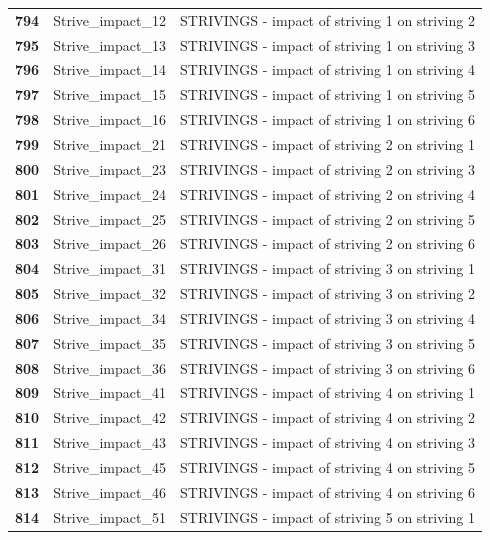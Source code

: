 \documentclass[
  letterpaper,
  DIV=11,
  numbers=noendperiod]{scrartcl}
\begin{document}
\begin{longtable}[t]{>{}cll}
\textbf{794} & Strive\_impact\_12 & STRIVINGS - impact of striving 1 on striving 2\\
\textbf{795} & Strive\_impact\_13 & STRIVINGS - impact of striving 1 on striving 3\\
\addlinespace
\textbf{796} & Strive\_impact\_14 & STRIVINGS - impact of striving 1 on striving 4\\
\textbf{797} & Strive\_impact\_15 & STRIVINGS - impact of striving 1 on striving 5\\
\textbf{798} & Strive\_impact\_16 & STRIVINGS - impact of striving 1 on striving 6\\
\textbf{799} & Strive\_impact\_21 & STRIVINGS - impact of striving 2 on striving 1\\
\textbf{800} & Strive\_impact\_23 & STRIVINGS - impact of striving 2 on striving 3\\
\addlinespace
\textbf{801} & Strive\_impact\_24 & STRIVINGS - impact of striving 2 on striving 4\\
\textbf{802} & Strive\_impact\_25 & STRIVINGS - impact of striving 2 on striving 5\\
\textbf{803} & Strive\_impact\_26 & STRIVINGS - impact of striving 2 on striving 6\\
\textbf{804} & Strive\_impact\_31 & STRIVINGS - impact of striving 3 on striving 1\\
\textbf{805} & Strive\_impact\_32 & STRIVINGS - impact of striving 3 on striving 2\\
\addlinespace
\textbf{806} & Strive\_impact\_34 & STRIVINGS - impact of striving 3 on striving 4\\
\textbf{807} & Strive\_impact\_35 & STRIVINGS - impact of striving 3 on striving 5\\
\textbf{808} & Strive\_impact\_36 & STRIVINGS - impact of striving 3 on striving 6\\
\textbf{809} & Strive\_impact\_41 & STRIVINGS - impact of striving 4 on striving 1\\
\textbf{810} & Strive\_impact\_42 & STRIVINGS - impact of striving 4 on striving 2\\
\addlinespace
\textbf{811} & Strive\_impact\_43 & STRIVINGS - impact of striving 4 on striving 3\\
\textbf{812} & Strive\_impact\_45 & STRIVINGS - impact of striving 4 on striving 5\\
\textbf{813} & Strive\_impact\_46 & STRIVINGS - impact of striving 4 on striving 6\\
\textbf{814} & Strive\_impact\_51 & STRIVINGS - impact of striving 5 on striving 1\\

\end{longtable}
\end{document}
